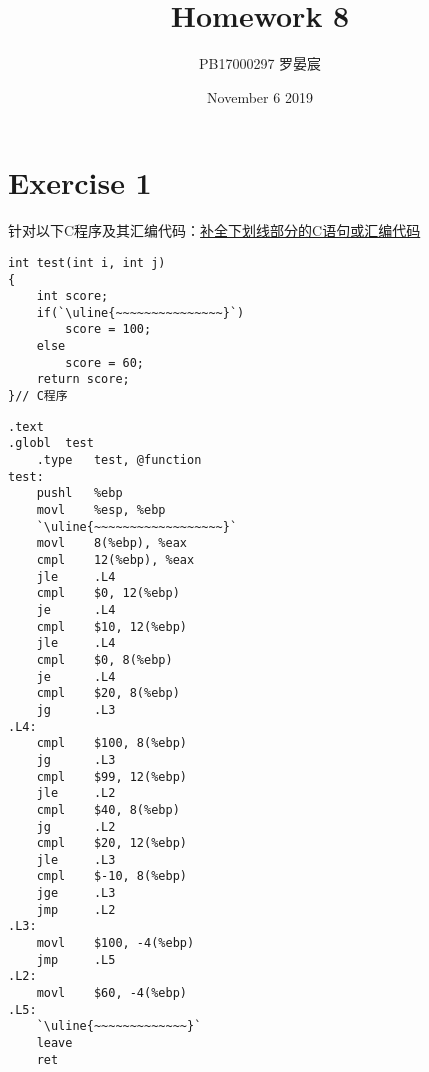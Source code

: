 \documentclass{article}
\title{Homework 8}
\author{PB17000297 罗晏宸}
\date{November 6 2019}
\begin{document}
\maketitle

\section*{Exercise 1}
针对以下C程序及其汇编代码：\uline{补全下划线部分的C语句或汇编代码}

\begin{multicols}{2}

    \begin{lstlisting}[style = C]
int test(int i, int j)
{
    int score;
    if(`\uline{~~~~~~~~~~~~~~~}`)
        score = 100;
    else
        score = 60;
    return score;
}// C程序
    \end{lstlisting}

    \begin{lstlisting}[style = Assembler, lineskip = 0.15em]
.text
.globl  test
    .type   test, @function
test:
    pushl   %ebp
    movl    %esp, %ebp
    `\uline{~~~~~~~~~~~~~~~~~~}`
    movl    8(%ebp), %eax
    cmpl    12(%ebp), %eax
    jle     .L4
    cmpl    $0, 12(%ebp)
    je      .L4
    cmpl    $10, 12(%ebp)
    jle     .L4
    cmpl    $0, 8(%ebp)
    je      .L4
    cmpl    $20, 8(%ebp)
    jg      .L3
.L4:
    cmpl    $100, 8(%ebp)
    jg      .L3
    cmpl    $99, 12(%ebp)
    jle     .L2
    cmpl    $40, 8(%ebp)
    jg      .L2
    cmpl    $20, 12(%ebp)
    jle     .L3
    cmpl    $-10, 8(%ebp)
    jge     .L3
    jmp     .L2
.L3:
    movl    $100, -4(%ebp)
    jmp     .L5
.L2:
    movl    $60, -4(%ebp)
.L5:
    `\uline{~~~~~~~~~~~~~}`
    leave
    ret
    \end{lstlisting}
\end{multicols}

\end{document}
